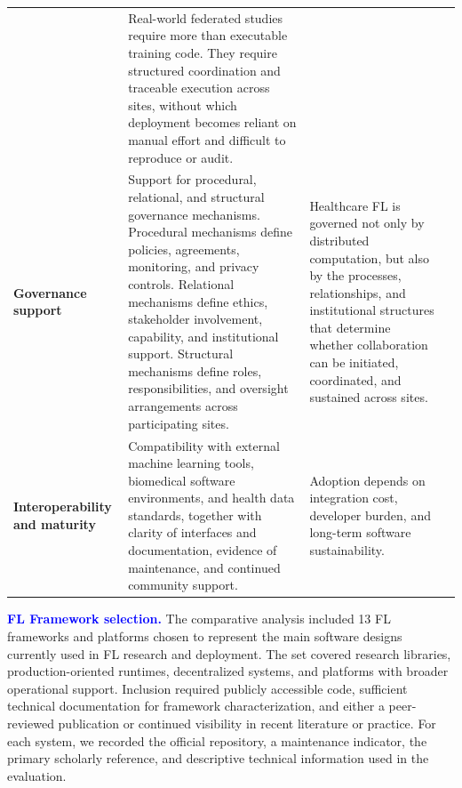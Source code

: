 \documentclass[preprint,5p, 10pt, times]{elsarticle}
\begin{document}
\begin{table}[t]
\begin{tabularx}{\textwidth}{
>{\raggedright\arraybackslash}p{2.2cm}
>{\raggedright\arraybackslash}X
>{\raggedright\arraybackslash}X
>{\centering\arraybackslash}p{1.1cm}}
& Real-world federated studies require more than executable training code. They require structured coordination and traceable execution across sites, without which deployment becomes reliant on manual effort and difficult to reproduce or audit.
& \cite{schlegel2026lowering, chavero2026federated,chai2024survey} \\
\addlinespace[4pt]

\textbf{Governance support}
& Support for procedural, relational, and structural governance mechanisms. 
Procedural mechanisms define policies, agreements, monitoring, and privacy controls. 
Relational mechanisms define ethics, stakeholder involvement, capability, and institutional support. 
Structural mechanisms define roles, responsibilities, and oversight arrangements across participating sites.
& Healthcare FL is governed not only by distributed computation, but also by the processes, relationships, and institutional structures that determine whether collaboration can be initiated, coordinated, and sustained across sites.
& \cite{eden2025scoping, wen2023survey,ahmed2026privacy} \\
\addlinespace[4pt]

\textbf{Interoperability and maturity}
& Compatibility with external machine learning tools, biomedical software environments, and health data standards, together with clarity of interfaces and documentation, evidence of maintenance, and continued community support.
& Adoption depends on integration cost, developer burden, and long-term software sustainability.
& \cite{chavero2026federated,lee2023feasibility,teo2024federated, lavin2022technology} \\

\bottomrule
\end{tabularx}
\end{table}


\textcolor{blue}{\textbf{FL Framework selection.}}
The comparative analysis included 13 FL frameworks and platforms chosen to represent the main software designs currently used in FL research and deployment. The set covered research libraries, production-oriented runtimes, decentralized systems, and platforms with broader operational support. Inclusion required publicly accessible code, sufficient technical documentation for framework characterization, and either a peer-reviewed publication or continued visibility in recent literature or practice. For each system, we recorded the official repository, a maintenance indicator, the primary scholarly reference, and descriptive technical information used in the evaluation.
\end{document}
